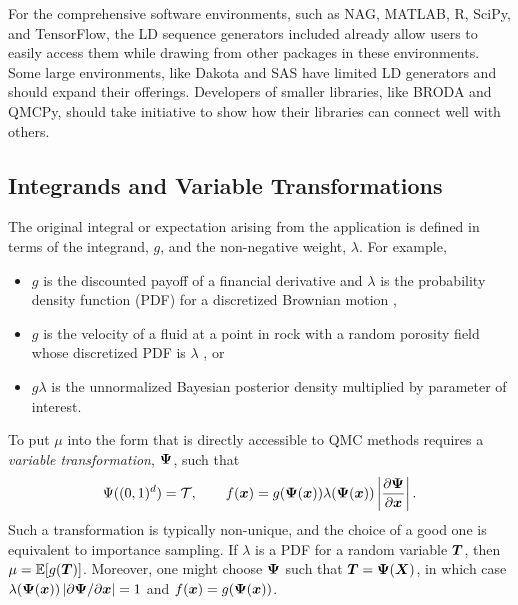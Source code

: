 \documentclass[graybox]{svmult}
\begin{document}
For the comprehensive software environments, such as NAG, MATLAB, R, SciPy, and TensorFlow, the LD sequence generators included already allow users to easily access them while drawing from other packages in these environments.  Some large environments, like Dakota \cite{DakotaUsersManual} and SAS have limited LD generators and should expand their offerings.  Developers of smaller libraries, like BRODA and QMCPy, should take initiative to show how their libraries can connect well with others.

\subsection{Integrands and Variable Transformations} The original integral or expectation arising from the application is defined in terms of the integrand, $g$, and the non-negative weight, $\lambda$.  For example,
\begin{itemize}
	\item $g$ is the discounted payoff of a financial derivative and $\lambda$ is the probability density function (PDF) for a discretized Brownian motion \cite{Gla03},

	\item  $g$ is the velocity of a fluid at a point in rock with a random porosity field whose discretized PDF is $\lambda$ \cite{}, or

	\item $g\lambda$ is the unnormalized Bayesian posterior density multiplied by parameter of interest.
\end{itemize}

To put $\mu$ into the form that is directly accessible to QMC methods requires a \emph{variable transformation}, ${\boldsymbol{\Psi}}$, such that
\begin{equation*}
    \Psi((0,1)^d) = {\mathcal{T}}, \qquad f({\boldsymbol{x}}) = g({\boldsymbol{\Psi}}({\boldsymbol{x}})) \lambda({\boldsymbol{\Psi}}({\boldsymbol{x}})) \left\vert\frac{\partial {\boldsymbol{\Psi}}}{\partial{\boldsymbol{x}}}\right\vert.
\end{equation*}
Such a transformation is typically non-unique, and the choice of a good one is equivalent to importance sampling.  If $\lambda$ is a PDF for a random variable ${\boldsymbol{T}}$, then $\mu = {\mathbb{E}}[g({\boldsymbol{T}})]$.  Moreover, one might choose ${\boldsymbol{\Psi}}$ such that ${\boldsymbol{T}} = {\boldsymbol{\Psi}}({\boldsymbol{X}})$, in which case $\lambda({\boldsymbol{\Psi}}({\boldsymbol{x}})) \left\vert\partial {\boldsymbol{\Psi}}/\partial{\boldsymbol{x}}\right\vert = 1$ and $f({\boldsymbol{x}}) = g({\boldsymbol{\Psi}}({\boldsymbol{x}}))$.
\end{document}
